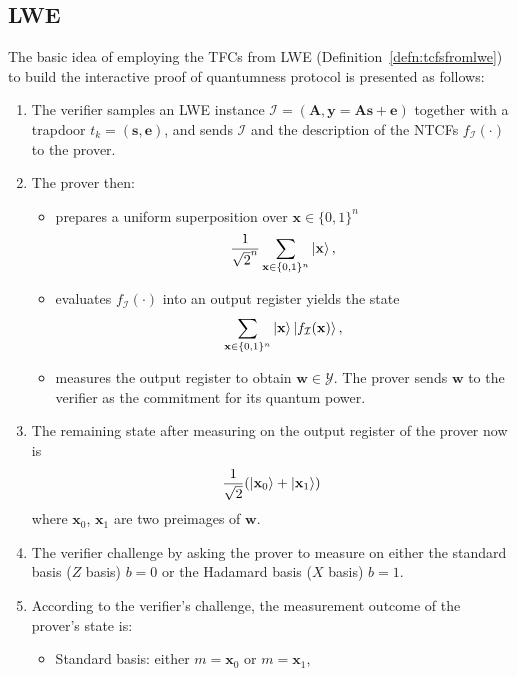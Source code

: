 \subsection{LWE}
The basic idea of employing the TFCs from LWE (Definition~\ref{defn:tcfsfromlwe}) to build the interactive proof of quantumness protocol is presented as follows:
\begin{enumerate}
    \item The verifier samples an LWE instance $\mathcal{I}=(\mathbf{A},\mathbf{y}=\mathbf{A}\mathbf{s}+\mathbf{e})$ together with a trapdoor $t_{k}=(\mathbf{s},\mathbf{e})$, and sends $\mathcal{I}$ and the description of the NTCFs $f_{\mathcal{I}}(\cdot)$ to the prover.
    \item The prover then:
    \begin{itemize}
        \item prepares a uniform superposition over $\mathbf{x}\in\{0,1\}^n$
        \begin{align}
            \frac{1}{\sqrt{2}^n}\sum_{\mathbf{x}\in\{0,1\}^n}\ket{\mathbf{x}},
        \end{align}
        \item evaluates $f_\mathcal{I}(\cdot)$ into an output register yields the state
        \begin{align}
            \sum_{\mathbf{x}\in\{0,1\}^n}\ket{\mathbf{x}}\ket{f_{\mathcal{I}}(\mathbf{x})},
        \end{align}        
        \item measures the output register to obtain $\mathbf{w}\in\mathcal{Y}$.
    The prover sends $\mathbf{w}$ to the verifier as the commitment for its quantum power.
    \end{itemize}
    \item The remaining state after measuring on the output register of the prover now is
    \begin{align}
        \frac{1}{\sqrt{2}}(\ket{\mathbf{x}_0}+\ket{\mathbf{x}_1})
    \end{align}
    where $\mathbf{x}_0$, $\mathbf{x}_1$ are two preimages of $\mathbf{w}$.
    \item The verifier challenge by asking the prover to measure on either the standard basis ($Z$ basis) $b=0$ or the Hadamard basis ($X$ basis) $b=1$.
    \item According to the verifier's challenge, the measurement outcome of the prover's state is:
    \begin{itemize}
        \item Standard basis: either $m=\mathbf{x}_0$ or $m=\mathbf{x}_1$, 

\end{itemize}
\end{enumerate}
